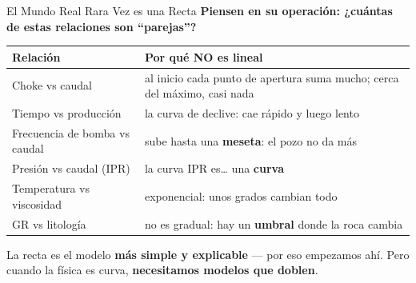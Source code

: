 \documentclass[aspectratio=169, 11pt]{beamer}
\begin{document}
\begin{frame}[shrink=18]{El Mundo Real Rara Vez es una Recta}
  \vspace{-4pt}
  {\small\color{arcaDark}\bfseries
    Piensen en su operación: ¿cuántas de estas relaciones son ``parejas''?}

  \vspace{6pt}
  \centering
  {\footnotesize
  \renewcommand{\arraystretch}{1.5}
  \begin{tabular}{@{}p{4.6cm} p{6.8cm}@{}}
    \toprule
    {\bfseries\color{arcaDark} Relación} & {\bfseries\color{arcaRed} Por qué NO es lineal} \\
    \midrule
    \rowcolor{arcaGray}
    Choke vs caudal & al inicio cada punto de apertura suma mucho; cerca del máximo, casi nada \\
    Tiempo vs producción & la curva de declive: cae rápido y luego lento \\
    \rowcolor{arcaGray}
    Frecuencia de bomba vs caudal & sube hasta una \textbf{meseta}: el pozo no da más \\
    Presión vs caudal (IPR) & la curva IPR es\ldots{} una \textbf{curva} \\
    \rowcolor{arcaGray}
    Temperatura vs viscosidad & exponencial: unos grados cambian todo \\
    GR vs litología & no es gradual: hay un \textbf{umbral} donde la roca cambia \\
    \bottomrule
  \end{tabular}
  }

  \vspace{8pt}
  {\footnotesize\color{textMuted}
    \faLightbulb[regular]\hspace{4pt}%
    La recta es el modelo \textbf{más simple y explicable} --- por eso empezamos ahí.
    Pero cuando la física es curva, \textbf{necesitamos modelos que doblen}.}
\end{frame}
\end{document}
